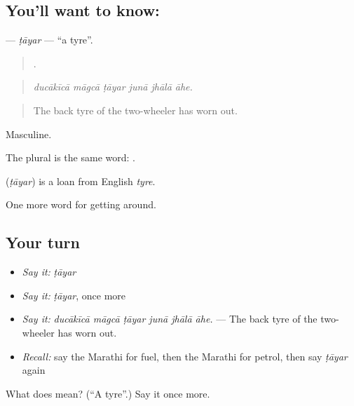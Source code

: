 \subsection*{You'll want to know: }
\textbf{} — \emph{ṭāyar} — \textquotedblleft{}a tyre\textquotedblright{}.

\begin{quote}
     .
\end{quote}

\begin{quote}
\emph{ducākīcā māgcā ṭāyar junā jhālā āhe.}
\end{quote}

\begin{quote}
The back tyre of the two-wheeler has worn out.
\end{quote}

Masculine.

The plural is the same word:  .

\begin{cousinweb}
\textbf{} (\emph{ṭāyar}) is a loan from English \emph{tyre}.
\end{cousinweb}

\begin{grammarlens}[title={What you've built}]
One more word for getting around.
\end{grammarlens}

\subsection*{Your turn}
\begin{itemize}
\raggedright
  \item \emph{Say it:} \emph{ṭāyar}
  \item \emph{Say it:} \emph{ṭāyar}, once more
  \item \emph{Say it:} \emph{ducākīcā māgcā ṭāyar junā jhālā āhe.} — The back tyre of the two-wheeler has worn out.
  \item \emph{Recall:} say the Marathi for fuel, then the Marathi for petrol, then say \emph{ṭāyar} again
\end{itemize}

\begin{tcolorbox}[breakable,colback=teal!4,colframe=teal!35!black,title={Before you move on}]
What does  mean? (\textquotedblleft{}A tyre\textquotedblright{}.) Say it once more.
\end{tcolorbox}
